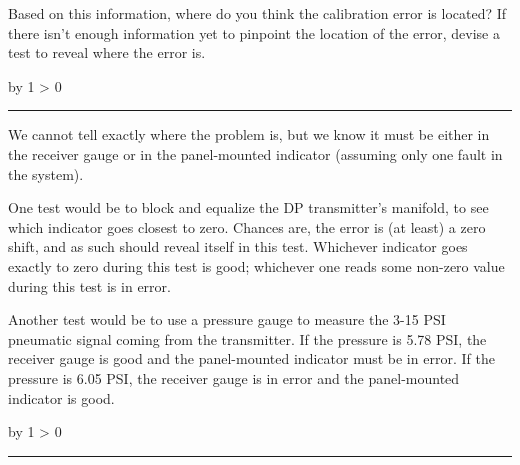 \documentclass[12pt,a4paper]{article}
\def\svar{
           \advance\answnum by 1
           \ifnum \answnum > 0
                \hrule
                \vskip 3pt
                \leftline{Svar \the\answnum}
                \vskip 3pt \fi}
\def\notes{
           \advance\explnum by 1
           \ifnum \explnum > 0
                \hrule
                \vskip 3pt
                \leftline{Notes \the\explnum}
                \vskip 3pt \fi}
\begin{document}
\vskip 10pt

Based on this information, where do you think the calibration error is located?  If there isn't enough information yet to pinpoint the location of the error, devise a test to reveal where the error is.

\vskip 10pt \filbreak 





\svar{} 

We cannot tell exactly where the problem is, but we know it must be either in the receiver gauge or in the panel-mounted indicator (assuming only one fault in the system).

\vskip 10pt

One test would be to block and equalize the DP transmitter's manifold, to see which indicator goes closest to zero.  Chances are, the error is (at least) a zero shift, and as such should reveal itself in this test.  Whichever indicator goes exactly to zero during this test is good; whichever one reads some non-zero value during this test is in error.

\vskip 10pt

Another test would be to use a pressure gauge to measure the 3-15 PSI pneumatic signal coming from the transmitter.  If the pressure is 5.78 PSI, the receiver gauge is good and the panel-mounted indicator must be in error.  If the pressure is 6.05 PSI, the receiver gauge is in error and the panel-mounted indicator is good.

\vskip 10pt \filbreak 





\notes{} 



\vfil \eject 
\end{document}
